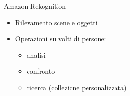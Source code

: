 %
\begin{frame}[t]{Amazon Rekognition}
\begin{itemize}
	\item Rilevamento scene e oggetti
	\item Operazioni su volti di persone:
	\begin{itemize}
		\item analisi
		\item confronto
		\item ricerca (collezione personalizzata)
	\end{itemize}
\end{itemize}
\end{frame}
%
